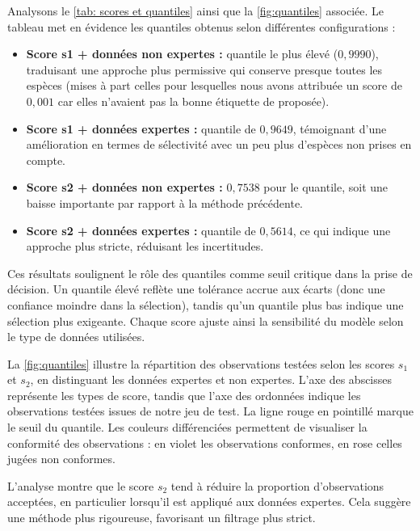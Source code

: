 \documentclass[a4paper,12pt]{article}
\begin{document}
Analysons le \autoref{tab: scores et quantiles} ainsi que la \autoref{fig:quantiles} associée. Le tableau met en évidence les quantiles obtenus selon différentes configurations :
\begin{itemize}
    \item \textbf{Score s1 + données non expertes :} quantile le plus élevé ($0,9990$), traduisant une approche plus permissive qui conserve presque toutes les espèces (mises à part celles pour lesquelles nous avons attribuée un score de $0,001$ car elles n'avaient pas la bonne étiquette de proposée).
    \item \textbf{Score s1 + données expertes :} quantile de $0,9649$, témoignant d’une amélioration en termes de sélectivité avec un peu plus d'espèces non prises en compte.
    \item \textbf{Score s2 + données non expertes :} $0,7538$ pour le quantile, soit une baisse importante par rapport à la méthode précédente.
    \item \textbf{Score s2 + données expertes :} quantile de $0,5614$, ce qui indique une approche plus stricte, réduisant les incertitudes.
\end{itemize}

\vspace{0.2cm}

Ces résultats soulignent le rôle des quantiles comme seuil critique dans la prise de décision. Un quantile élevé reflète une tolérance accrue aux écarts (donc une confiance moindre dans la sélection), tandis qu’un quantile plus bas indique une sélection plus exigeante. Chaque score ajuste ainsi la sensibilité du modèle selon le type de données utilisées.

\vspace{0.2cm}

La \autoref{fig:quantiles} illustre la répartition des observations testées selon les scores $s_1$ et $s_2$, en distinguant les données expertes et non expertes.
L’axe des abscisses représente les types de score, tandis que l’axe des ordonnées indique les observations testées issues de notre jeu de test. La ligne rouge en pointillé marque le seuil du quantile. Les couleurs différenciées permettent de visualiser la conformité des observations : en violet les observations conformes, en rose celles jugées non conformes.

\vspace{0.2cm}

L’analyse montre que le score $s_2$ tend à réduire la proportion d’observations acceptées, en particulier lorsqu’il est appliqué aux données expertes. Cela suggère une méthode plus rigoureuse, favorisant un filtrage plus strict.
\end{document}
